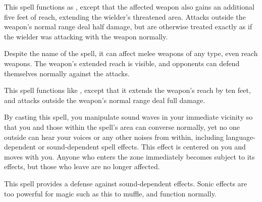 \spelldur{\durshort}
\begin{spelleffect}
  This spell functions as , except that the affected weapon also gains an additional five feet of reach, extending the wielder's threatened area. Attacks outside the weapon's normal range deal half damage, but are otherwise treated exactly as if the wielder was attacking with the weapon normally.
\end{spelleffect}
\begin{spellnotes}
  Despite the name of the spell, it can affect melee weapons of any type, even reach weapons. The weapon's extended reach is visible, and opponents can defend themselves normally against the attacks.
\end{spellnotes}

\begin{spelleffect}
  This spell functions like , except that it extends the weapon's reach by ten feet, and attacks outside the weapon's normal range deal full damage.
\end{spelleffect}

\begin{spelleffect}
  By casting this spell, you manipulate sound waves in your immediate vicinity so that you and those within the spell's area can converse normally, yet no one outside can hear your voices or any other noises from within, including language-dependent or sound-dependent spell effects. This effect is centered on you and moves with you. Anyone who enters the zone immediately becomes subject to its effects, but those who leave are no longer affected.
\end{spelleffect}
\begin{spellnotes}
  This spell provides a defense against sound-dependent effects. Sonic effects are too powerful for magic such as this to muffle, and function normally.
\end{spellnotes}

